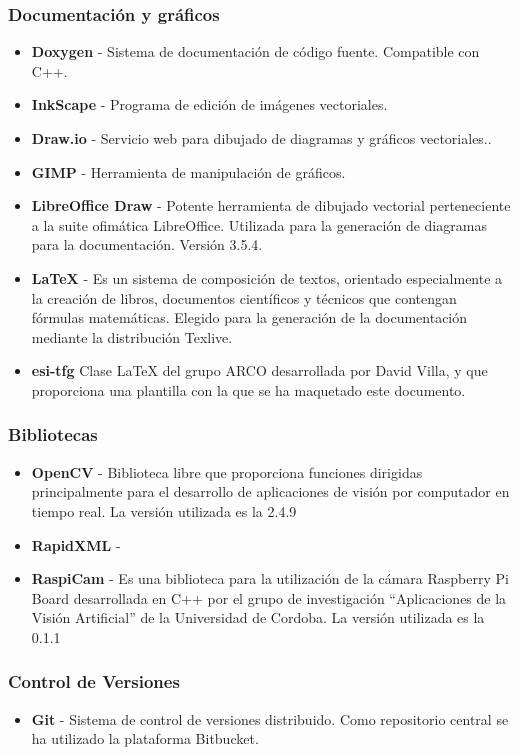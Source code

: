 \subsubsection{Documentación y gráficos}
\begin{itemize}
\item \textbf{Doxygen} - Sistema de documentación de código fuente. Compatible con C++.
\item \textbf{InkScape} - Programa de edición de imágenes vectoriales.
\item \textbf{Draw.io} - Servicio web para dibujado de diagramas y gráficos vectoriales..
\item \textbf{GIMP} - Herramienta de manipulación de gráficos.
\item \textbf{LibreOffice Draw} - Potente herramienta de dibujado vectorial perteneciente a la suite ofimática LibreOffice. Utilizada para la generación de diagramas para la documentación. Versión 3.5.4.
\item \textbf{\LaTeX{}} - Es un sistema de composición de textos, orientado especialmente a la creación de libros, documentos científicos y técnicos que contengan fórmulas matemáticas. Elegido para la generación de la documentación mediante la distribución Texlive. 
\item  \textbf{esi-tfg} Clase \LaTeX{} del grupo \acs{ARCO} desarrollada por David Villa, y que proporciona una plantilla con la que se ha maquetado este documento.
\end{itemize}


\subsubsection{Bibliotecas}
\begin{itemize}
\item \textbf{OpenCV} - Biblioteca libre que proporciona funciones dirigidas principalmente para el desarrollo de aplicaciones de visión por computador en tiempo real. La versión utilizada es la 2.4.9
\item \textbf{RapidXML} - 
\item \textbf{RaspiCam} -  Es una biblioteca para la utilización de la cámara Raspberry Pi Board desarrollada en C++ por el grupo de investigación ``Aplicaciones de la Visión Artificial'' de la Universidad de Cordoba. La versión utilizada es la 0.1.1 
\end{itemize}

\subsubsection{Control de Versiones}
\begin{itemize}
\item \textbf{Git} - Sistema de control de versiones distribuido. Como repositorio central se ha utilizado la plataforma Bitbucket.
\end{itemize}
